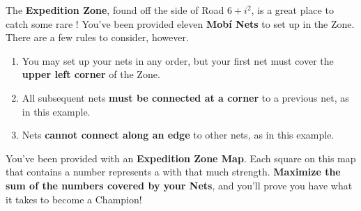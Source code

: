 

The \textbf{Expedition Zone}, found off the side of
Road \(6+i^2\), is a great place to catch some rare \mappMobimon{}!
You've been provided eleven \textbf{Mob\'i Nets}
to set up in the Zone. There are a few rules to consider, however.

\begin{enumerate}
\item You may set up your nets in any order, but your first net must cover
      the \textbf{upper left corner} of the Zone.
\item All subsequent nets \textbf{must be connected at a corner}
      to a previous net, as in this example.

\begin{center}
\end{center}

\item Nets \textbf{cannot connect along an edge} to other nets,
      as in this example.


\begin{center}
\end{center}
\end{enumerate}

You've been provided with an \textbf{Expedition Zone Map}. Each square
on this map that contains a number represents a \mappMobimon{} with
that much strength.
\textbf{Maximize the sum of the numbers covered by your Nets},
and you'll prove you have what it takes to become a \mappMobimon{} Champion!


